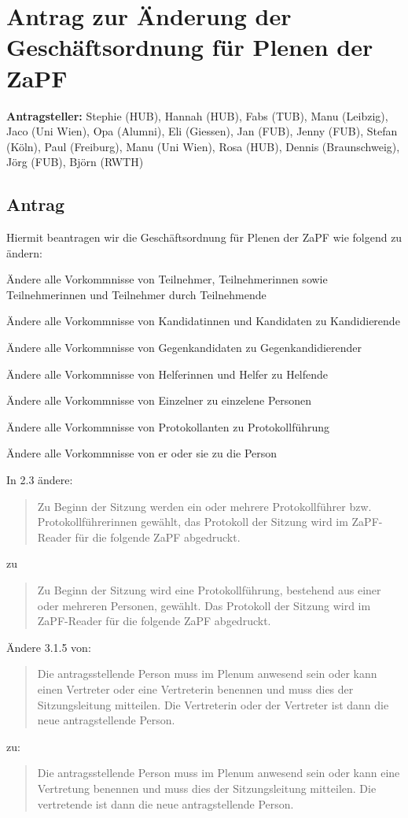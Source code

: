 \documentclass[draft,10pt,oneside]{scrartcl}
\begin{document}
\section*{Antrag zur Änderung der Geschäftsordnung für Plenen der ZaPF}

\textbf{Antragsteller:} Stephie (HUB), Hannah (HUB), Fabs (TUB), Manu (Leibzig), Jaco (Uni Wien), Opa (Alumni), Eli (Giessen), Jan (FUB), Jenny (FUB), Stefan (Köln), Paul (Freiburg), Manu (Uni Wien), Rosa (HUB), Dennis (Braunschweig), 
Jörg (FUB), Björn (RWTH)

\subsection*{Antrag}

Hiermit beantragen wir die Geschäftsordnung für Plenen der ZaPF wie folgend zu
ändern:

Ändere alle Vorkommnisse von \glqq{}Teilnehmer\grqq{}, \glqq{}Teilnehmerinnen\grqq{} sowie \glqq{}Teilnehmerinnen und Teilnehmer\grqq{} durch \glqq{}Teilnehmende\grqq{}

Ändere alle Vorkommnisse von \glqq{}Kandidatinnen und Kandidaten\grqq{} zu \glqq{}Kandidierende\grqq{}

Ändere alle Vorkommnisse von \glqq{}Gegenkandidaten\grqq{} zu \glqq{}Gegenkandidierender\grqq{}

Ändere alle Vorkommnisse von \glqq{}Helferinnen und Helfer\grqq{} zu \glqq{}Helfende\grqq{}

Ändere alle Vorkommnisse von \glqq{}Einzelner\grqq{} zu \glqq{}einzelene Personen\grqq{}

Ändere alle Vorkommnisse von \glqq{}Protokollanten\grqq{} zu \glqq{}Protokollführung\grqq{}

Ändere alle Vorkommnisse von \glqq{}er oder sie\grqq{} zu \glqq{}die Person\grqq{}

In 2.3 ändere:
\begin{quote}
    Zu Beginn der Sitzung werden ein oder mehrere Protokollführer bzw.
    Protokollführerinnen gewählt, das Protokoll der Sitzung wird im
    ZaPF-Reader für die folgende ZaPF abgedruckt.
\end{quote}
zu
\begin{quote}
    Zu Beginn der Sitzung wird eine Protokollführung, bestehend aus einer
    oder mehreren Personen, gewählt.
    Das Protokoll der Sitzung wird im ZaPF-Reader für die folgende ZaPF
    abgedruckt.
\end{quote}

Ändere 3.1.5 von:
\begin{quote}
    Die antragsstellende Person muss im Plenum anwesend sein
    oder kann einen Vertreter oder eine Vertreterin benennen und muss dies
    der Sitzungsleitung mitteilen.
    Die Vertreterin oder der Vertreter ist dann die neue antragstellende Person.
\end{quote}
zu:
\begin{quote}
    Die antragsstellende Person muss im Plenum anwesend sein
    oder kann eine Vertretung benennen und muss dies
    der Sitzungsleitung mitteilen.
    Die vertretende ist dann die neue antragstellende Person.
\end{quote}
\end{document}
